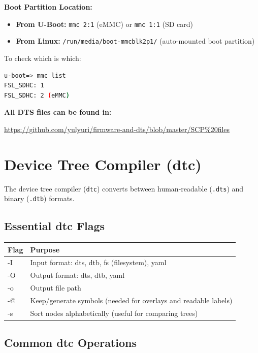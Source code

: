\documentclass[12pt,a4paper]{report}
\begin{document}
\begin{important}
\textbf{Boot Partition Location:}
\begin{itemize}
    \item \textbf{From U-Boot:} \texttt{mmc 2:1} (eMMC) or \texttt{mmc 1:1} (SD card)
    \item \textbf{From Linux:} \texttt{/run/media/boot-mmcblk2p1/} (auto-mounted boot partition)
\end{itemize}

To check which is which:
\begin{lstlisting}[language=bash]
u-boot=> mmc list
FSL_SDHC: 1
FSL_SDHC: 2 (eMMC)
\end{lstlisting}
\end{important}

\begin{gitref}
\textbf{All DTS files can be found in:}

\url{https://github.com/yulyuri/firmware-and-dts/blob/master/SCP%20files}
\end{gitref}
\section{Device Tree Compiler (dtc)}

The device tree compiler (\texttt{dtc}) converts between human-readable (\texttt{.dts}) and binary (\texttt{.dtb}) formats.

\subsection{Essential dtc Flags}

\begin{center}
\begin{tabular}{|l|p{9cm}|}
\hline
\textbf{Flag} & \textbf{Purpose} \\
\hline
-I  & Input format: dts, dtb, fs (filesystem), yaml \\
\hline
-O  & Output format: dts, dtb, yaml \\
\hline
-o  & Output file path \\
\hline
-@ & Keep/generate symbols (needed for overlays and readable labels) \\
\hline
-s & Sort nodes alphabetically (useful for comparing trees) \\
\hline
\end{tabular}
\end{center}

\subsection{Common dtc Operations}
\end{document}
